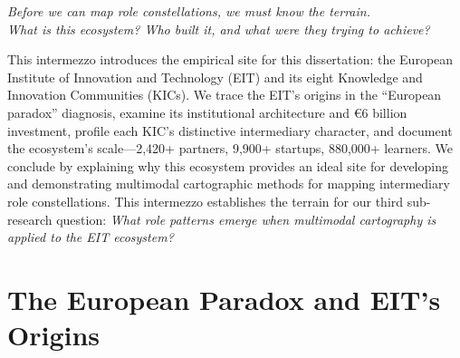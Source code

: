 \documentclass[../main.tex]{subfiles}
\begin{document}


\begin{center}
\end{center}

\vspace{1cm}

\begin{center}
\textit{\large Before we can map role constellations, we must know the terrain.\\[0.3em]
What is this ecosystem? Who built it, and what were they trying to achieve?}
\end{center}

\vspace{1.5cm}

\begin{chapteroverview}
This intermezzo introduces the empirical site for this dissertation: the European Institute of Innovation and Technology (EIT) and its eight Knowledge and Innovation Communities (KICs). We trace the EIT's origins in the ``European paradox'' diagnosis, examine its institutional architecture and €6 billion investment, profile each KIC's distinctive intermediary character, and document the ecosystem's scale---2,420+ partners, 9,900+ startups, 880,000+ learners. We conclude by explaining why this ecosystem provides an ideal site for developing and demonstrating multimodal cartographic methods for mapping intermediary role constellations. This intermezzo establishes the terrain for our third sub-research question: \textit{What role patterns emerge when multimodal cartography is applied to the EIT ecosystem?}
\end{chapteroverview}


\section*{The European Paradox and EIT's Origins}
\end{document}
